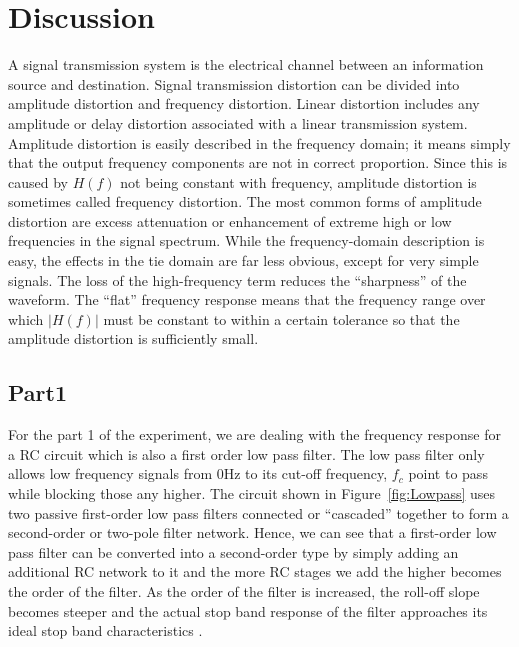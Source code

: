 \documentclass[a4paper, 12pt, english]{article}
\begin{document}
\section{Discussion}
A signal transmission system is the electrical channel between an information
source and destination. Signal transmission distortion can be divided into
amplitude distortion and frequency distortion. Linear distortion includes any
amplitude or delay distortion associated with a linear transmission system.
Amplitude distortion is easily described in the frequency domain; it means
simply that the output frequency components are not in correct proportion.
Since this is caused by $H(f)$ not being constant with frequency, amplitude
distortion is sometimes called frequency distortion. The most common forms of
amplitude distortion are excess attenuation or enhancement of extreme high or
low frequencies in the signal spectrum. While the frequency-domain description
is easy, the effects in the tie domain are far less obvious, except for very
simple signals. The loss of the high-frequency term reduces the “sharpness” of
the waveform. The “flat” frequency response means that the frequency range over
which $|H(f)|$ must be constant to within a certain tolerance so that the
amplitude distortion is sufficiently small.

\subsection{Part1}
For the part 1 of the experiment, we are dealing with the frequency response
for a RC circuit which is also a first order low pass filter. The low pass
filter only allows low frequency signals from 0Hz to its cut-off frequency,
$f_{c}$ point to pass while blocking those any higher. The circuit shown in
Figure~\ref{fig:Lowpass} uses two passive first-order low pass filters
connected or “cascaded” together to form a second-order or two-pole filter
network. Hence, we can see that a first-order low pass filter can be converted
into a second-order type by simply adding an additional RC network to it and
the more RC stages we add the higher becomes the order of the filter. As the
order of the filter is increased, the roll-off slope becomes steeper and the
actual stop band response of the filter approaches its ideal stop band
characteristics \cite{LPF}. \newline
\end{document}
